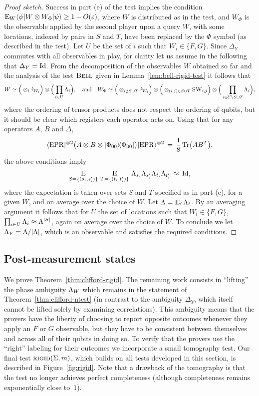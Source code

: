 \begin{proof}[Proof sketch]
Success in part (e) of the test implies the condition $ \mathop{\textsc{E}}_{W} \langle\psi| W
  \otimes W_\Phi |\psi\rangle \geq 1-O(\varepsilon)$, where $W$ is distributed as in the
  test, and $W_{\Phi}$ is the observable applied by the second player upon a
  query $W$, with some locations, indexed by pairs in $S$ and $T$, have been
  replaced by the $\Phi$ symbol (as described in the test). Let $U$ be the set of $i$ such that $W_i\in \{F,G\}$. Since $\Delta_Y$ commutes with all observables in play, for clarity let us assume in the following that $\Delta_Y = \mathop{\rm Id}\nolimits$. 
From the decomposition of the observables $W$ obtained so far and the analysis of the test $\textsc{Bell}$ given in Lemma~\ref{lem:bell-rigid-test} it follows that 
$$W \simeq \Big(\otimes_i {\hat{\tau}_{W_i}} \Big)\otimes \Big(\prod_{i\in U} \Lambda_i\Big),\quad\text{and}\quad W_\Phi \simeq  \Big(\otimes_{i\notin S\cup T} {\hat{\tau}_{W_i}}\Big)\otimes\Big( \otimes_{(i,j)\in S\cup T} \textsc{SW}_{i,j} \Big)\otimes \Big(\prod_{i\in U\backslash S\cup T} \Lambda_i\Big),$$
where the ordering of tensor products does not respect the ordering of qubits, but it should be clear which registers each operator acts on. Using that for any operators $A$, $B$ and $\Delta$, 
$$\langle{\rm EPR}|^{\otimes 2}  \big(A \otimes B \otimes |\Phi_{00}\rangle\!\langle\Phi_{00}|\big)|{\rm EPR}\rangle^{\otimes 2}  \,=\, \frac{1}{8}\,\mbox{\rm Tr}\big(AB^T\big) ,$$
the above conditions imply 
$$\mathop{\textsc{E}}_{S=\{(s_i,s'_i)\}}\, \mathop{\textsc{E}}_{T=\{(t_i,t'_i)\}} \, \Lambda_{s_i}\Lambda_{s'_i} \Lambda_{t_i}\Lambda_{t'_i} \,\approx\, \mathop{\rm Id}\nolimits,$$
where the expectation is taken over sets $S$ and $T$ specified as in part (e), for a given $W$, and on average over the choice of $W$. Let $\Lambda = \mathop{\textsc{E}}_{i} \Lambda_i$. By an averaging argument it follows that for $U$ the set of locations such that $W_i \in \{F,G\}$, $\prod_{i\in U} \Lambda_i \approx \Lambda^{|S|}$, again on average over the choice of $W$. To conclude we let $\Lambda_F = \Lambda/|\Lambda|$, which is an observable and satisfies the required conditions. 
\end{proof}


\subsection{Post-measurement states}
\label{sec: RIGID test}

We prove Theorem~\ref{thm:clifford-rigid}. The remaining work consists in ``lifting'' the phase ambiguity $\Lambda_W$ which remains in the statement of Theorem~\ref{thm:clifford-ntest} (in contrast to the ambiguity $\Delta_Y$, which itself cannot be lifted solely by examining correlations). This ambiguity means that the provers have the liberty of choosing to report opposite outcomes whenever they apply an $F$ or $G$ observable, but they have to be consistent between themselves and across all of their qubits in doing so. To verify that the provers use the ``right'' labeling for their outcomes we  incorporate a small tomography test. Our final test  $\textsc{rigid}(\Sigma,m)$, which builds on all tests developed in this section, is described in Figure~\ref{fig:rigid}. Note that a drawback of the tomography is that the test no longer achieves perfect completeness (although completeness remains exponentially close to~$1$). 

